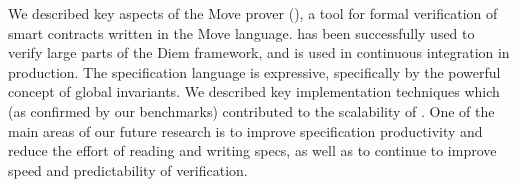 
We described key aspects of the Move prover (\MVP), a tool for formal
verification of smart contracts written in the Move language. \MVP has been
successfully used to verify large parts of the Diem framework, and is used in
continuous integration in production. The specification language is expressive,
specifically by the powerful concept of global invariants.  We described key
implementation techniques which (as confirmed by our benchmarks) contributed to
the scalability of \MVP. One of the main areas of our future research is to
improve specification productivity and reduce the effort of reading and writing
specs, as well as to continue to improve speed and predictability of
verification.



